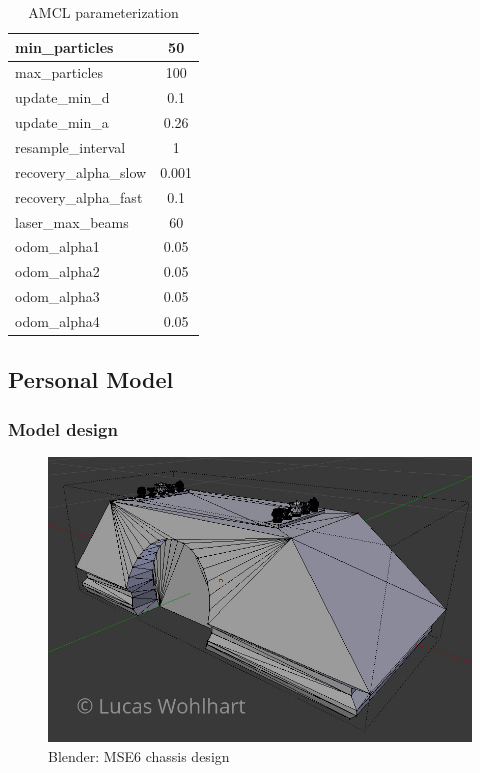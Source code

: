 \documentclass[10pt,journal,compsoc]{IEEEtran}
\begin{document}
\begin{table}[h]
      \caption{AMCL parameterization}
      \label{tab:amcl_parameterization}
      \begin{center}
            \begin{tabular}{|l|c|}  \hline
min\_particles & 50 \\ \hline
max\_particles & 100 \\ \hline
update\_min\_d & 0.1 \\ \hline
update\_min\_a & 0.26 \\ \hline
resample\_interval & 1 \\ \hline
recovery\_alpha\_slow & 0.001 \\ \hline
recovery\_alpha\_fast & 0.1 \\ \hline

laser\_max\_beams & 60 \\ \hline
odom\_alpha1 & 0.05 \\ \hline
odom\_alpha2 & 0.05 \\ \hline
odom\_alpha3 & 0.05 \\ \hline
odom\_alpha4 & 0.05 \\ \hline
\end{tabular}
\end{center}
\end{table}                  


\subsection{Personal Model}
\subsubsection{Model design}
\begin{figure}[thpb]
      \centering
      \includegraphics[width=\linewidth]{img/blender_mse6_chassis}
      \caption{Blender: MSE6 chassis design}
      \label{fig:blender_design_mse6}
\end{figure}
\end{document}
